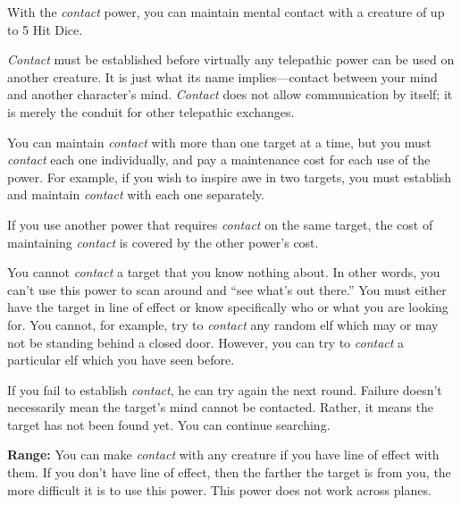 {
	With the \emph{contact} power, you can maintain mental contact with a creature of up to 5 Hit Dice.

	\emph{Contact} must be established before virtually any telepathic power can be used on another creature. It is just what its name implies---contact between your mind and another character's mind. \emph{Contact} does not allow communication by itself; it is merely the conduit for other telepathic exchanges.

	You can maintain \emph{contact} with more than one target at a time, but you must \emph{contact} each one individually, and pay a maintenance cost for each use of the power. For example, if you wish to inspire awe in two targets, you must establish and maintain \emph{contact} with each one separately.

	If you use another power that requires \emph{contact} on the same target, the cost of maintaining \emph{contact} is covered by the other power's cost.

	You cannot \emph{contact} a target that you know nothing about. In other words, you can't use this power to scan around and ``see what's out there.'' You must either have the target in line of effect or know specifically who or what you are looking for. You cannot, for example, try to \emph{contact} any random elf which may or may not be standing behind a closed door. However, you can try to \emph{contact} a particular elf which you have seen before.

	If you fail to establish \emph{contact}, he can try again the next round. Failure doesn't necessarily mean the target's mind cannot be contacted. Rather, it means the target has not been found yet. You can continue searching.

	\textbf{Range:} You can make \emph{contact} with any creature if you have line of effect with them. If you don't have line of effect, then the farther the target is from you, the more difficult it is to use this power. This power does not work across planes.


}
